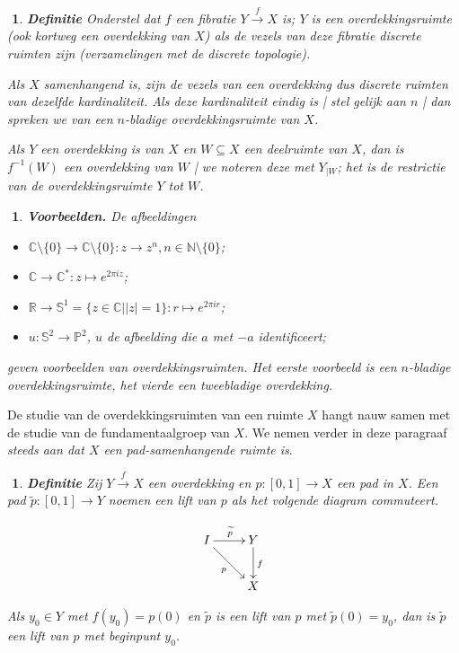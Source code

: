 \documentclass[12pt]{book}
\newcommand{\R}{\mathbb{R}}
\newcommand{\C}{\mathbb{C}}
\newtheorem{vbnh}[stelh]{$\!\!$}
\newenvironment{vbn}{\begin{vbnh} \em {\bf Voorbeelden.}}{\end{vbnh}}
\newtheorem{dfh}[stelh]{$\!\!$}
\newenvironment{df}{\begin{dfh} \em {\bf Definitie }}{\end{dfh}}
\begin{document}
\begin{df} Onderstel dat $f$ een fibratie $Y\stackrel{f}{\to} X$ is; $Y$ is een  {\em overdekkingsruimte} (ook kortweg een  {\em overdekking} van $X$) als de vezels van deze fibratie discrete ruimten  zijn (verzamelingen met de discrete topologie). 

Als $X$ samenhangend is, zijn de vezels van een overdekking dus discrete ruimten van dezelfde kardinaliteit. Als deze kardinaliteit eindig is | stel gelijk aan $n$ | dan spreken we van een $n$-{\em bladige overdekkingsruimte} van $X$.

Als $Y$ een overdekking is van $X$ en $W\subseteq X$ een deelruimte  van $X$, dan is $f^{-1}(W)$ een overdekking van $W$ | we noteren deze met $Y_{|W}$; het is de {\em restrictie} van de overdekkings\-ruimte $Y$ tot  $W$.
\end{df}

\begin{vbn} \label{overd} De afbeeldingen
\begin{itemize}
\item $\C\setminus\{0\} \to \C\setminus \{0\}: z\to z^n, n\in \mathbb{N}\setminus\{0\}$;
\item $\C \to \C^{*}: z\mapsto e^{2\pi iz}$;
\item $\R \to\mathbb{S}^{1}= \{z\in \C||z|=1\}: r\mapsto e^{2\pi ir}$;
\item $u:\mathbb{S}^{2}\to \mathbb{P}^{2}$, $u$ de afbeelding die $a$ met $-a$ identificeert;
\end{itemize}
geven voorbeelden van overdekkingsruimten. Het eerste voorbeeld is een $n$-bladige overdek\-kingsruimte, het vierde een tweebladige overdekking.
\end{vbn}

De studie van de overdekkingsruimten van een ruimte $X$ hangt nauw samen met de studie van de fundamentaalgroep van $X$. 
We nemen verder in deze paragraaf {\em steeds aan dat $X$ een pad-samenhangende ruimte is}.

\begin{df} Zij $Y\stackrel{f}{\to} X$ een overdekking en $p:[0,1]\to X$ een pad in $X$. Een pad $\widetilde{p}:[0,1]\to Y$ noemen een  {\em lift} van $p$ als het volgende diagram commuteert.

$$\xymatrix{
I \ar[r]^{\widetilde{p}} \ar[rd]_p & Y \ar[d]^f \\
& X 
}$$


Als $y_0\in Y$ met $f(y_0)=p(0)$ en $\widetilde{p}$ is een lift van $p$ met $\widetilde{p}(0)=y_0$, dan is $\widetilde{p}$ een {\em lift} van $p$ met {\em beginpunt} $y_0$.
\end{df}
\end{document}
